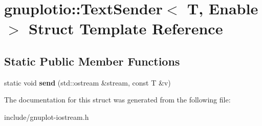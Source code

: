 \hypertarget{structgnuplotio_1_1TextSender}{}\section{gnuplotio\+:\+:Text\+Sender$<$ T, Enable $>$ Struct Template Reference}
\label{structgnuplotio_1_1TextSender}
\subsection*{Static Public Member Functions}
\begin{DoxyCompactItemize}
\item 
\mbox{\label{structgnuplotio_1_1TextSender_a03b58292dc75a4137d30ad7fffd762c6}} 
static void {\bfseries send} (std\+::ostream \&stream, const T \&v)
\end{DoxyCompactItemize}


The documentation for this struct was generated from the following file\+:\begin{DoxyCompactItemize}
\item 
include/gnuplot-\/iostream.\+h\end{DoxyCompactItemize}
